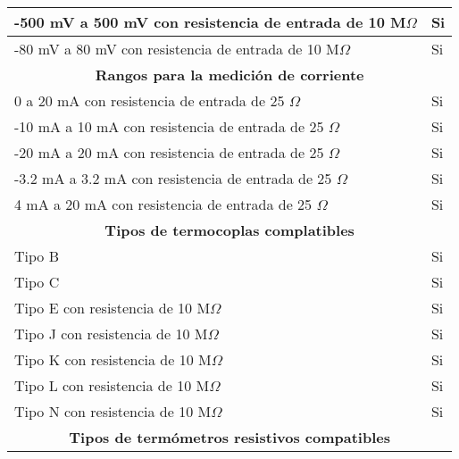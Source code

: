 \begin{table}[ht]
\begin{tabular}{|l|l|}
\multicolumn{1}{|l|}{-500 mV a 500 mV con resistencia de entrada de 10 M$\Omega$} & \multicolumn{1}{l|}{Si}    \\ \hline
\multicolumn{1}{|l|}{-80 mV a 80 mV con resistencia de entrada de 10 M$\Omega$}   & \multicolumn{1}{l|}{Si}    \\ \hline
\multicolumn{2}{|c|}{\textbf{Rangos para la medición de corriente}}                                     \\ \hline
\multicolumn{1}{|l|}{0 a 20 mA con resistencia de entrada de 25 $\Omega$}         & \multicolumn{1}{l|}{Si}    \\ \hline
\multicolumn{1}{|l|}{-10 mA a 10 mA con resistencia de entrada de 25 $\Omega$}    & \multicolumn{1}{l|}{Si}    \\ \hline
\multicolumn{1}{|l|}{-20 mA a 20 mA con resistencia de entrada de 25 $\Omega$}    & \multicolumn{1}{l|}{Si}    \\ \hline
\multicolumn{1}{|l|}{-3.2 mA a 3.2 mA con resistencia de entrada de 25 $\Omega$}  & \multicolumn{1}{l|}{Si}    \\ \hline
\multicolumn{1}{|l|}{4 mA a 20 mA con resistencia de entrada de 25 $\Omega$}      & \multicolumn{1}{l|}{Si}    \\ \hline
\multicolumn{2}{|c|}{\textbf{Tipos de termocoplas complatibles}}                                        \\ \hline
\multicolumn{1}{|l|}{Tipo B}                                               & \multicolumn{1}{l|}{Si}    \\ \hline
\multicolumn{1}{|l|}{Tipo C}                                               & \multicolumn{1}{l|}{Si}    \\ \hline
\multicolumn{1}{|l|}{Tipo E con resistencia de 10 M$\Omega$}                       & \multicolumn{1}{l|}{Si}    \\ \hline
\multicolumn{1}{|l|}{Tipo J con resistencia de 10 M$\Omega$}                       & \multicolumn{1}{l|}{Si}    \\ \hline
\multicolumn{1}{|l|}{Tipo K con resistencia de 10 M$\Omega$}                       & \multicolumn{1}{l|}{Si}    \\ \hline
\multicolumn{1}{|l|}{Tipo L con resistencia de 10 M$\Omega$}                       & \multicolumn{1}{l|}{Si}    \\ \hline
\multicolumn{1}{|l|}{Tipo N con resistencia de 10 M$\Omega$}                       & \multicolumn{1}{l|}{Si}    \\ \hline
\multicolumn{2}{|c|}{\textbf{Tipos de termómetros resistivos compatibles}}                              \\ \hline

\end{tabular}
\end{table}
